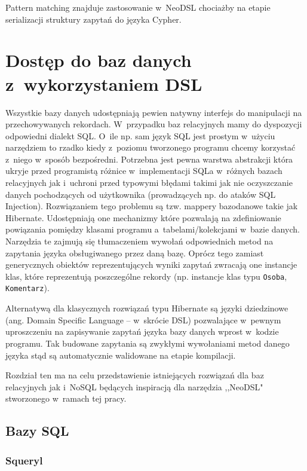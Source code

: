 \documentclass[brudnopis]{xmgr}
\begin{document}
Pattern matching znajduje zastosowanie w~NeoDSL chociażby na etapie serializacji struktury zapytań do języka Cypher.

\chapter{Dostęp do baz danych z~wykorzystaniem DSL}

Wszystkie bazy danych udostępniają pewien natywny interfejs do manipulacji na przechowywanych rekordach. W~przypadku baz relacyjnych mamy do dyspozycji odpowiedni dialekt SQL. O~ile np. sam język SQL jest prostym w~użyciu narzędziem to rzadko kiedy z~poziomu tworzonego programu chcemy korzystać z~niego w~sposób bezpośredni. Potrzebna jest pewna warstwa abstrakcji która ukryje przed programistą różnice w~implementacji SQLa w~różnych bazach relacyjnych jak i~uchroni przed typowymi błędami takimi jak nie oczyszczanie danych pochodzących od użytkownika (prowadzących np. do ataków SQL Injection). Rozwiązaniem tego problemu są tzw. mappery bazodanowe takie jak Hibernate. Udostępniają one mechanizmy które pozwalają na zdefiniowanie powiązania pomiędzy klasami programu a~tabelami/kolekcjami w~bazie danych. Narzędzia te zajmują się tłumaczeniem wywołań odpowiednich metod na zapytania języka obsługiwanego przez daną bazę. Oprócz tego zamiast generycznych obiektów reprezentujących wyniki zapytań zwracają one instancje klas, które reprezentują poszczególne rekordy (np. instancje klas typu \texttt{Osoba}, \texttt{Komentarz}).

Alternatywą dla klasycznych rozwiązań typu Hibernate są języki dziedzinowe (ang. Domain Specific Language -- w~skrócie DSL)  pozwalające w~pewnym uproszczeniu na zapisywanie zapytań języka bazy danych wprost w~kodzie programu. Tak budowane zapytania są zwykłymi wywołaniami metod danego języka stąd są automatycznie walidowane na etapie kompilacji.

Rozdział ten ma na celu przedstawienie istniejących rozwiązań dla baz relacyjnych jak i~NoSQL będących inspiracją dla narzędzia ,,NeoDSL" stworzonego w~ramach tej pracy.

\section{Bazy SQL}

\subsection{Squeryl}
\end{document}
